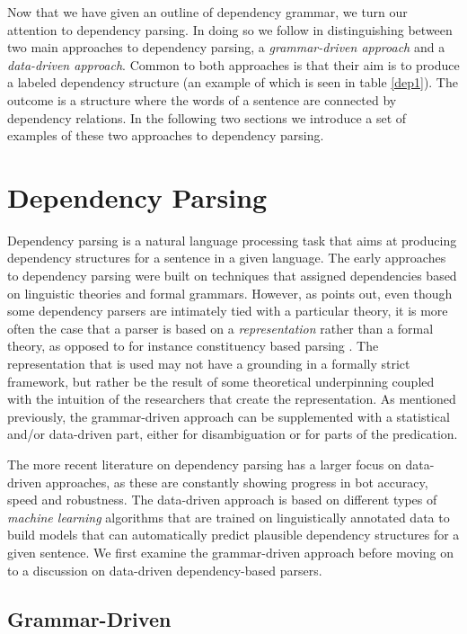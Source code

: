 Now that we have given an outline of dependency grammar, we turn our attention to dependency parsing. In doing so we follow  in distinguishing between two main approaches to dependency parsing, a \textit{grammar-driven approach} and a \textit{data-driven approach}. Common to both approaches is that their aim is to produce a labeled dependency structure (an example of which is seen in table \ref{dep1}). The outcome is a structure where the words of a sentence are connected by dependency relations. In the following two sections we introduce a set of examples of these two approaches to dependency parsing.

\section{Dependency Parsing}
\label{parsing}

Dependency parsing is a natural language processing task that aims at producing dependency structures for a sentence in a given language. The early approaches to dependency parsing were built on techniques that assigned dependencies based on linguistic theories and formal grammars. However, as \citeauthor{Niv:05} points out, even though some dependency parsers are intimately tied with a particular theory, it is more often the case that a parser is based on a \textit{representation} rather than a formal theory, as opposed to for instance constituency based parsing \cite{Niv:05}. The representation that is used may not have a grounding in a formally strict framework, but rather be the result of some theoretical underpinning coupled with the intuition of the researchers that create the representation. As mentioned previously, the grammar-driven approach can be supplemented with a statistical and/or data-driven part, either for disambiguation or for parts of the predication.

The more recent literature on dependency parsing has a larger focus on data-driven approaches, as these are constantly showing progress in bot accuracy, speed and robustness. The data-driven approach is based on different types of \textit{machine learning} algorithms that are trained on linguistically annotated data to build models that can automatically predict plausible dependency structures for a given sentence. We first examine the grammar-driven approach before moving on to a discussion on data-driven dependency-based parsers.

\subsection{Grammar-Driven}
\label{grammar-driven}


